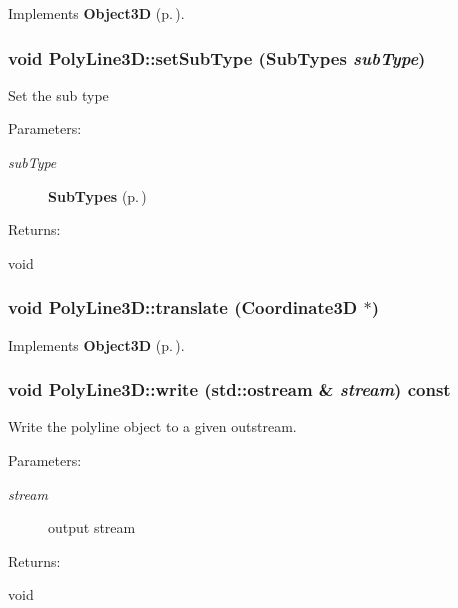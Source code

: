 Implements {\bf Object3D} {\rm (p.\,\pageref{classObject3D_a1})}.
\subsubsection{\setlength{\rightskip}{0pt plus 5cm}void Poly\-Line3D::set\-Sub\-Type ({\bf Sub\-Types} {\em sub\-Type})\hspace{0.3cm}{\tt  [inline, protected]}}\label{classPolyLine3D_b0}


Set the sub type \begin{Desc}
\item[Parameters: ]\par
\begin{description}
\item[{\em 
sub\-Type}]{\bf Sub\-Types} {\rm (p.\,\pageref{classPolyLine3D_s5})} \end{description}
\end{Desc}
\begin{Desc}
\item[Returns: ]\par
void \end{Desc}
\subsubsection{\setlength{\rightskip}{0pt plus 5cm}void Poly\-Line3D::translate ({\bf Coordinate3D} $\ast$)\hspace{0.3cm}{\tt  [virtual]}}\label{classPolyLine3D_a7}




Implements {\bf Object3D} {\rm (p.\,\pageref{classObject3D_a3})}.
\subsubsection{\setlength{\rightskip}{0pt plus 5cm}void Poly\-Line3D::write (std::ostream \& {\em stream}) const\hspace{0.3cm}{\tt  [virtual]}}\label{classPolyLine3D_a8}


Write the polyline object to a given outstream. \begin{Desc}
\item[Parameters: ]\par
\begin{description}
\item[{\em 
stream}]output stream \end{description}
\end{Desc}
\begin{Desc}
\item[Returns: ]\par
void \end{Desc}


